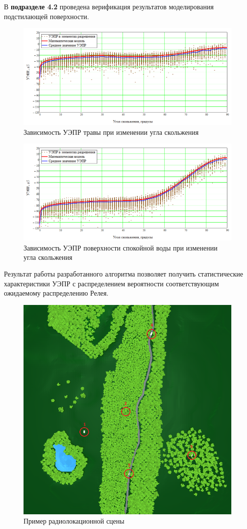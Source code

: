 В \textbf{подразделе 4.2} проведена верификация результатов моделирования подстилающей поверхности.

\begin{figure}[h]
    \centering
    \includegraphics[width=0.9\linewidth]{Synopsis/images/surface_grass}
    \caption{Зависимость УЭПР травы при изменении угла скольжения}
    \label{fig:surfacegrass}
\end{figure}
\begin{figure}[h]
    \centering
    \includegraphics[width=0.9\linewidth]{Synopsis/images/surface_water}
    \caption{Зависимость УЭПР поверхности спокойной воды при изменении угла скольжения}
    \label{fig:surfacewater}
\end{figure}

Результат работы разработанного алгоритма позволяет получить статистические характеристики УЭПР с распределением вероятности соответствующим ожидаемому распределению Релея. %

\begin{figure}
    \centering
    \includegraphics[width=0.7\linewidth]{Synopsis/images/top}
    \caption{Пример радиолокационной сцены}
    \label{fig:top}
\end{figure}

